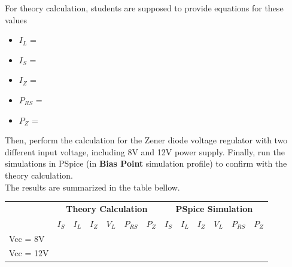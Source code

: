 For theory calculation, students are supposed to provide equations for these values
\begin{itemize}
    \item $I_{L}$ = \dotfill\\
    \item $I_{S}$ = \dotfill\\
    \item $I_{Z}$ = \dotfill\\
    \item $P_{RS}$ = \dotfill\\
    \item $P_{Z}$ = \dotfill\\
\end{itemize}

Then, perform the calculation for the Zener diode voltage regulator with two different input voltage, including 8V and 12V power supply. Finally, run the simulations in PSpice (in \textbf{Bias Point} simulation profile) to confirm with the theory calculation. \\

The results are summarized in the table bellow.

\begin{center}
    \begin{tabular}{l|l|l|l|l|l|l|l|l|l|l|l|l|}
        \cline{2-13}
                                        & \multicolumn{6}{c|}{\textbf{Theory Calculation}} & \multicolumn{6}{c|}{\textbf{PSpice Simulation}}                                                                                                                                                      \\ \cline{2-13}
                                        & \multicolumn{1}{c|}{$I_S$}                       & \multicolumn{1}{c|}{$I_L$}                      & \multicolumn{1}{c|}{$I_Z$} & \multicolumn{1}{c|}{$V_L$} & \multicolumn{1}{c|}{$P_{RS}$} & $P_Z$ & $I_S$ & $I_L$ & $I_Z$ & $V_L$ & $P_{RS}$ & $P_Z$ \\ \hline
        \multicolumn{1}{|l|}{Vcc = 8V}  &                                                  &                                                 &                            &                            &                               &       &       &       &       &       &          &       \\ \hline
        \multicolumn{1}{|l|}{Vcc = 12V} &                                                  &                                                 &                            &                            &                               &       &       &       &       &       &          &       \\ \hline
    \end{tabular}
\end{center}

